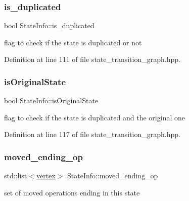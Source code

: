 \mbox{\label{structStateInfo_ad1d889cb48ee33781bea376337901fda}} 
\subsubsection{\texorpdfstring{is\+\_\+duplicated}{is\_duplicated}}
{\footnotesize\ttfamily bool State\+Info\+::is\+\_\+duplicated}



flag to check if the state is duplicated or not 



Definition at line 111 of file state\+\_\+transition\+\_\+graph.\+hpp.

\mbox{\label{structStateInfo_aa28e78be94499966b41c6011dffdefb7}} 
\subsubsection{\texorpdfstring{is\+Original\+State}{isOriginalState}}
{\footnotesize\ttfamily bool State\+Info\+::is\+Original\+State}



flag to check if the state is duplicated and the original one 



Definition at line 117 of file state\+\_\+transition\+\_\+graph.\+hpp.

\mbox{\label{structStateInfo_aa4fe1013312b3b0cd7b9f3e64be4f57e}} 
\subsubsection{\texorpdfstring{moved\+\_\+ending\+\_\+op}{moved\_ending\_op}}
{\footnotesize\ttfamily std\+::list$<$\hyperlink{graph_8hpp_abefdcf0544e601805af44eca032cca14}{vertex}$>$ State\+Info\+::moved\+\_\+ending\+\_\+op}



set of moved operations ending in this state 



